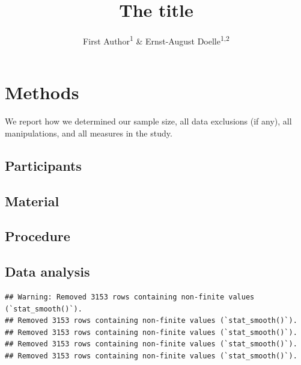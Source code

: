 \documentclass[
  man]{apa6}
\title{The title}
\author{First Author\textsuperscript{1} \& Ernst-August Doelle\textsuperscript{1,2}}
\date{}
\affiliation{\vspace{0.5cm}\textsuperscript{1} Wilhelm-Wundt-University\\\textsuperscript{2} Konstanz Business School}
\begin{document}
\maketitle

\hypertarget{methods}{%
\section{Methods}\label{methods}}

We report how we determined our sample size, all data exclusions (if any), all manipulations, and all measures in the study.

\hypertarget{participants}{%
\subsection{Participants}\label{participants}}

\hypertarget{material}{%
\subsection{Material}\label{material}}

\hypertarget{procedure}{%
\subsection{Procedure}\label{procedure}}

\hypertarget{data-analysis}{%
\subsection{Data analysis}\label{data-analysis}}

\begin{verbatim}
## Warning: Removed 3153 rows containing non-finite values (`stat_smooth()`).
## Removed 3153 rows containing non-finite values (`stat_smooth()`).
## Removed 3153 rows containing non-finite values (`stat_smooth()`).
## Removed 3153 rows containing non-finite values (`stat_smooth()`).
## Removed 3153 rows containing non-finite values (`stat_smooth()`).
\end{verbatim}
\end{document}
